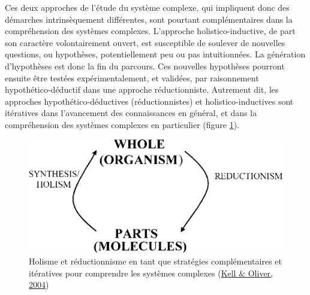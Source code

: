 \documentclass[12pt,twoside]{reedthesis}
\begin{document}
Ces deux approches de l'étude du système complexe, qui impliquent donc des démarches intrinsèquement différentes, sont pourtant complémentaires dans la compréhension des systèmes complexes. L'approche holistico-inductive, de part son caractère volontairement ouvert, est susceptible de soulever de nouvelles questions, ou hypothèses, potentiellement peu ou pas intuitionnées. La génération d'hypothèses est donc la fin du parcours. Ces nouvelles hypothèses pourront ensuite être testées expérimentalement, et validées, par raisonnement hypothético-déductif dans une approche réductionniste. Autrement dit, les approches hypothético-déductives (réductionnistes) et holistico-inductives sont itératives dans l'avancement des connaissances en général, et dans la compréhension des systèmes complexes en particulier (figure \ref{fig:holism-reductionism}).\\
\begin{figure}

{\centering \includegraphics[width=0.6\linewidth]{figure/holism_reductionism} 

}

\caption[Holisme et réductionnisme en tant que stratégies complémentaires et itératives pour comprendre les systèmes complexes]{Holisme et réductionnisme en tant que stratégies complémentaires et itératives pour comprendre les systèmes complexes (\protect\hyperlink{ref-kell_here_2004}{Kell \& Oliver, 2004})}\label{fig:holism-reductionism}
\end{figure}
\end{document}
